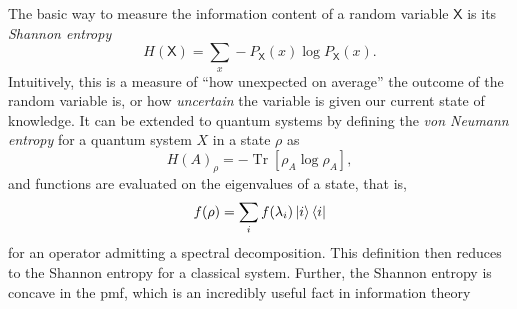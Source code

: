 \documentclass[10pt, a4paper]{article}
\numberwithin{equation}{section} %
\theoremstyle{definition}
\theoremstyle{plain}
\newcommand{\?}{\mathrel{?}} %
\newcommand{\Tr}[2][]{\mathop{\mathrm{Tr}#1}\left[ #2 \right]} %
\newcommand{\crv}[1]{\mathsf{#1}}
\begin{document}
\begin{appendices}
                          The basic way to measure the information content of a random variable \(\crv{X}\) is its \emph{Shannon entropy}
                          \begin{equation}
                            H(\crv{X}) = \sum_{x} - P_{\crv{X}}(x) \log P_{\crv{X}}(x).
                          \end{equation}
                          Intuitively, this is a measure of ``how unexpected on average'' the outcome of the random variable is, or how \emph{uncertain} the variable is given our current state of knowledge. It can be extended to quantum systems by defining the \emph{von Neumann entropy} for a quantum system \(X\) in a state \(\rho\) as 
                          \begin{equation}
                            {H(A)}_{\rho} = -\Tr{\rho_{A}\log\rho_{A}},
                          \end{equation}
                          and functions are evaluated on the eigenvalues of a state, that is,
                          \begin{equation}
                            f(\rho) = \sum_i f(\lambda_i) \ket{i}\bra{i}
                          \end{equation}
                          for an operator admitting a spectral decomposition. This definition then reduces to the Shannon entropy for a classical system. Further, the Shannon entropy is concave in the pmf, which is an incredibly useful fact in information theory


\end{appendices}
\end{document}
